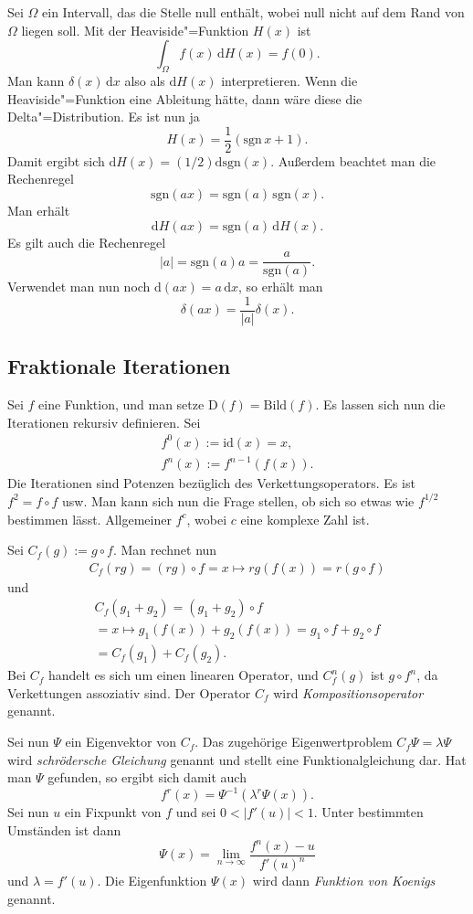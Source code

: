\documentclass[a4paper,10pt,fleqn,twocolumn,twoside]{article}
\begin{document}
Sei \(\Omega\) ein Intervall, das die Stelle null enthält, wobei
null nicht auf dem Rand von \(\Omega\) liegen soll. Mit der
Heaviside"=Funktion \(H(x)\) ist
\[\int_{\Omega} f(x)\,\mathrm dH(x) = f(0).\]
Man kann \(\delta(x)\,\mathrm dx\) also als \(\mathrm dH(x)\)
interpretieren. Wenn die Heaviside"=Funktion eine Ableitung hätte,
dann wäre diese die Delta"=Distribution. Es ist nun ja
\[H(x) = \frac{1}{2}(\mathrm{sgn}\,x+1).\]
Damit ergibt sich \(\mathrm dH(x) = (1/2)\mathrm d\mathrm{sgn}(x)\).
Außerdem beachtet man die Rechenregel
\[\mathrm{sgn}(ax) = \mathrm{sgn}(a)\,\mathrm{sgn}(x).\]
Man erhält
\[\mathrm dH(ax) = \mathrm{sgn}(a)\,\mathrm dH(x).\]
Es gilt auch die Rechenregel
\[|a| = \mathrm{sgn}(a)a = \frac{a}{\mathrm{sgn}(a)}.\]
Verwendet man nun noch \(\mathrm d(ax) = a\,\mathrm dx\),
so erhält man
\[\delta(ax) = \frac{1}{|a|}\delta(x).\]

\subsection{Fraktionale Iterationen}

Sei \(f\) eine Funktion, und man setze
\(\mathrm{D}(f)=\mathrm{Bild}(f)\). Es lassen sich nun die
Iterationen rekursiv definieren. Sei
\begin{gather*}
f^0(x) := \mathrm{id}(x) = x,\\
f^n(x) := f^{n-1}(f(x)).
\end{gather*}
Die Iterationen sind Potenzen bezüglich des Verkettungsoperators.
Es ist \(f^2=f\circ f\) usw. Man kann sich nun die Frage stellen,
ob sich so etwas wie \(f^{1/2}\) bestimmen lässt. Allgemeiner \(f^c\),
wobei \(c\) eine komplexe Zahl ist.

Sei \(C_f(g) := g\circ f\). Man rechnet nun
\begin{gather*}
C_f(rg) = (rg)\circ f = x\mapsto rg(f(x)) = r(g\circ f)
\end{gather*}
und
\begin{gather*}
C_f(g_1+g_2) = (g_1+g_2)\circ f\\
= x\mapsto g_1(f(x))+g_2(f(x))
= g_1\circ f+g_2\circ f
\\= C_f(g_1)+C_f(g_2).
\end{gather*}
Bei \(C_f\) handelt es sich um einen linearen Operator, und
\(C_f^n(g)\) ist \(g\circ f^n\), da Verkettungen assoziativ sind.
Der Operator \(C_f\) wird \textit{Kompositionsoperator} genannt.

Sei nun \(\Psi\) ein Eigenvektor von \(C_f\). Das zugehörige
Eigenwertproblem \(C_f\Psi = \lambda\Psi\) wird
\textit{schrödersche Gleichung}
genannt und stellt eine Funktionalgleichung dar. Hat man \(\Psi\)
gefunden, so ergibt sich damit auch
\[f^r(x) = \Psi^{-1}(\lambda^r\Psi(x)).\]
Sei nun \(u\) ein Fixpunkt von \(f\) und sei \(0<|f'(u)|<1\).
Unter bestimmten Umständen ist dann
\[\Psi(x) = \lim_{n\rightarrow\infty}\frac{f^n(x)-u}{f'(u)^n}\]
und \(\lambda=f'(u)\). Die Eigenfunktion \(\Psi(x)\) wird
dann \textit{Funktion von Koenigs} genannt.
\end{document}
